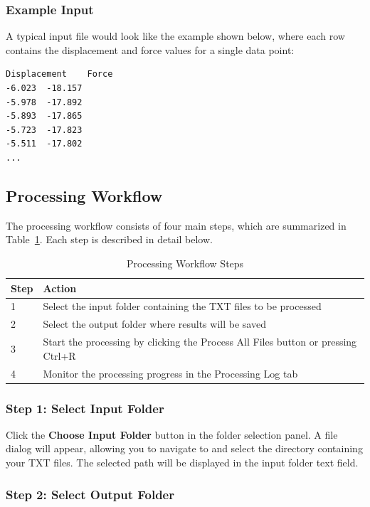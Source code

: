 \documentclass[11pt,a4paper]{article}
\begin{document}
\subsubsection{Example Input}

A typical input file would look like the example shown below, where each row contains the displacement and force values for a single data point:

\begin{lstlisting}
Displacement    Force
-6.023  -18.157
-5.978  -17.892
-5.893  -17.865
-5.723  -17.823
-5.511  -17.802
...
\end{lstlisting}

\subsection{Processing Workflow}

The processing workflow consists of four main steps, which are summarized in Table~\ref{tab:workflow}. Each step is described in detail below.

\begin{table}[h]
\centering
\caption{Processing Workflow Steps}\label{tab:workflow}
\begin{tabular}{p{3cm}p{11cm}}
\toprule
\textbf{Step} & \textbf{Action} \\
\midrule
1 & Select the input folder containing the TXT files to be processed \\
2 & Select the output folder where results will be saved \\
3 & Start the processing by clicking the Process All Files button or pressing Ctrl+R \\
4 & Monitor the processing progress in the Processing Log tab \\
\bottomrule
\end{tabular}
\end{table}

\subsubsection{Step 1: Select Input Folder}

Click the \textbf{Choose Input Folder} button in the folder selection panel. A file dialog will appear, allowing you to navigate to and select the directory containing your TXT files. The selected path will be displayed in the input folder text field.

\subsubsection{Step 2: Select Output Folder}
\end{document}
